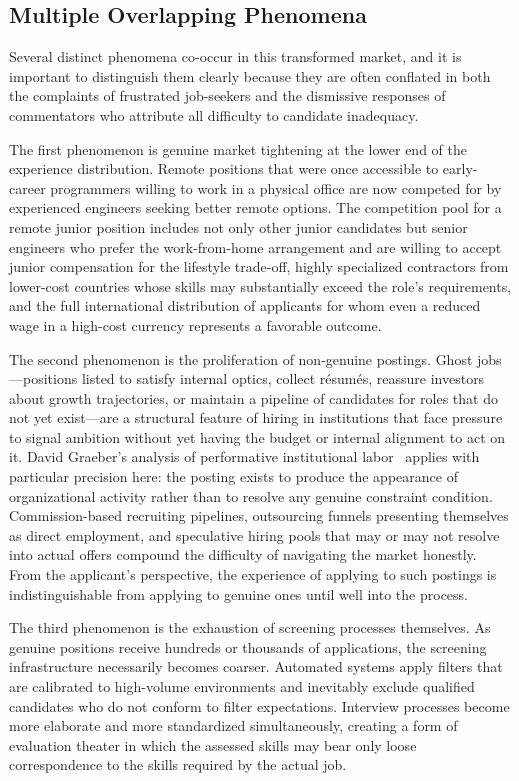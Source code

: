 \documentclass[12pt, a4paper]{article}
\theoremstyle{plain}
\theoremstyle{definition}
\theoremstyle{remark}
\begin{document}
\subsection{Multiple Overlapping Phenomena}

Several distinct phenomena co-occur in this transformed market,
and it is important to distinguish them clearly because they are
often conflated in both the complaints of frustrated job-seekers
and the dismissive responses of commentators who attribute all difficulty
to candidate inadequacy.

The first phenomenon is genuine market tightening at the lower end of the
experience distribution. Remote positions that were once accessible to
early-career programmers willing to work in a physical office are now
competed for by experienced engineers seeking better remote options.
The competition pool for a remote junior position includes not only other junior
candidates but senior engineers who prefer the work-from-home arrangement
and are willing to accept junior compensation for the lifestyle trade-off,
highly specialized contractors from lower-cost countries whose skills
may substantially exceed the role's requirements,
and the full international distribution of applicants for whom
even a reduced wage in a high-cost currency represents a favorable outcome.

The second phenomenon is the proliferation of non-genuine postings.
Ghost jobs---positions listed to satisfy internal optics, collect résumés,
reassure investors about growth trajectories, or maintain a pipeline
of candidates for roles that do not yet exist---are a structural feature
of hiring in institutions that face pressure to signal ambition
without yet having the budget or internal alignment to act on it.
David Graeber's analysis of performative institutional labor~\cite{davidgraeber2018}
applies with particular precision here: the posting exists to produce
the appearance of organizational activity rather than to resolve any
genuine constraint condition.
Commission-based recruiting pipelines, outsourcing funnels presenting themselves
as direct employment, and speculative hiring pools that may or may not resolve
into actual offers compound the difficulty of navigating the market honestly.
From the applicant's perspective, the experience of applying to such postings
is indistinguishable from applying to genuine ones until well into the process.

The third phenomenon is the exhaustion of screening processes themselves.
As genuine positions receive hundreds or thousands of applications,
the screening infrastructure necessarily becomes coarser.
Automated systems apply filters that are calibrated to high-volume environments
and inevitably exclude qualified candidates who do not conform to filter expectations.
Interview processes become more elaborate and more standardized simultaneously,
creating a form of evaluation theater in which the assessed skills
may bear only loose correspondence to the skills required by the actual job.
\end{document}
